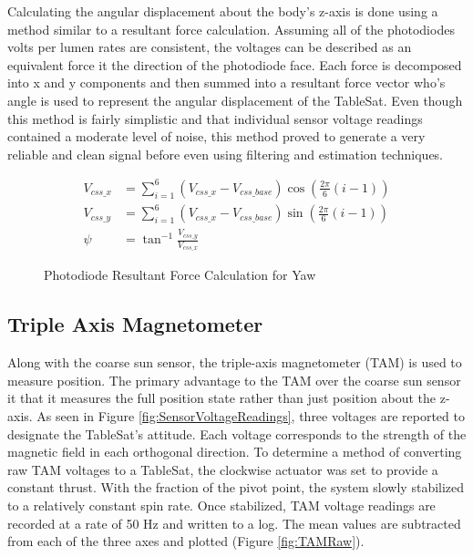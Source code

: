 Calculating the angular displacement about the body's z-axis is done using a method similar to a resultant force calculation.  Assuming all of the photodiodes volts per lumen rates are consistent, the voltages can be described as an equivalent force it the direction of the photodiode face.  Each force is decomposed into x and y components and then summed into a resultant force vector who's angle is used to represent the angular displacement of the TableSat.  Even though this method is fairly simplistic and that individual sensor voltage readings contained a moderate level of noise, this method proved to generate a very reliable and clean signal before even using filtering and estimation techniques.

\begin{subequations}
  \begin{align}
    V_{css\_x} & = \sum\limits_{i=1}^6 (V_{css\_x} - V_{css\_base}) \cos \left( \frac{2\pi}{6} (i-1)\right) \\
    V_{css\_y} & = \sum\limits_{i=1}^6 (V_{css\_x} - V_{css\_base}) \sin \left( \frac{2\pi}{6} (i-1)\right) \\
    \psi & = \tan^{-1} \frac{V_{css\_y}}{V_{css\_x}}
  \end{align}
  \label{eqn:CSSResultantForce}
\end{subequations}

\begin{figure}[H]
\centerline{}
\caption{Photodiode Resultant Force Calculation for Yaw}
\label{fig:CSSVectors}
\end{figure}


\subsection{Triple Axis Magnetometer}
\label{subsec:TripleAxisMagnetometer}

Along with the coarse sun sensor, the triple-axis magnetometer (TAM) is used to measure position.  The primary advantage to the TAM over the coarse sun sensor it that it measures the full position state rather than just position about the z-axis.  As seen in Figure \ref{fig:SensorVoltageReadings}, three voltages are reported to designate the TableSat's attitude.  Each voltage corresponds to the strength of the magnetic field in each orthogonal direction.  To determine a method of converting raw TAM voltages to a TableSat, the clockwise actuator was set to provide a constant thrust.  With the fraction of the pivot point, the system slowly stabilized to a relatively constant spin rate.  Once stabilized, TAM voltage readings are recorded at a rate of 50 Hz and written to a log.  The mean values are subtracted from each of the three axes and plotted (Figure \ref{fig:TAMRaw}).

